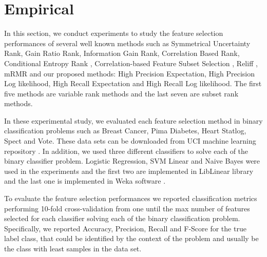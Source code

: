 \section{Empirical}

In this section, we conduct experiments to study the feature selection
performances of several well known methods such as Symmetrical
Uncertainty Rank, Gain Ratio Rank, Information Gain Rank, Correlation
Based Rank, Conditional Entropy Rank \cite{guyon_jmlr03},
Correlation-based Feature Subset Selection \cite{Hall1998}, Reliff
\cite{Robnik-Sikonja2003} , mRMR \cite{peng2005} and our proposed
methods: High Precision Expectation, High Precision Log likelihood,
High Recall Expectation and High Recall Log likelihood. The first five
methods are variable rank methods and the last seven are subset rank
methods.

In these experimental study, we evaluated each feature selection
method in binary classification problems such as Breast Cancer, Pima
Diabetes, Heart Statlog, Spect and Vote. These data sets can be
downloaded from UCI machine learning repository
\cite{Bache+Lichman:2013}. In addition, we used three different
classifiers to solve each of the binary classifier problem. Logistic
Regression, SVM Linear and Naive Bayes were used in the experiments
and the first two are implemented in LibLinear library \cite{REF08a}
and the last one is implemented in Weka software \cite{weka}.
 
To evaluate the feature selection performances we reported
classification metrics performing 10-fold cross-validation from one
until the max number of features selected for each classifier solving
each of the binary classification problem. Specifically, we reported
Accuracy, Precision, Recall and F-Score for the true label class, that
could be identified by the context of the problem and usually be the
class with least samples in the data set.
